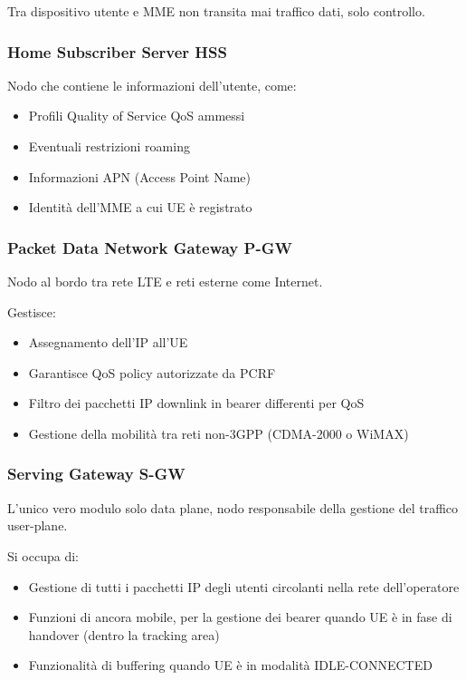 Tra dispositivo utente e MME non transita mai traffico dati, solo controllo.

\subsubsection{Home Subscriber Server HSS} 

Nodo che contiene le informazioni dell'utente, come: 
\begin{itemize}
	\item Profili Quality of Service QoS ammessi

	\item Eventuali restrizioni roaming

	\item Informazioni APN (Access Point Name)

	\item Identità dell'MME a cui UE è registrato
\end{itemize}

\subsubsection{Packet Data Network Gateway P-GW} 

Nodo al bordo tra rete LTE e reti esterne come Internet. 

Gestisce: 
\begin{itemize}
	\item Assegnamento dell'IP all'UE

	\item Garantisce QoS policy autorizzate da PCRF

	\item Filtro dei pacchetti IP downlink in bearer differenti per QoS

	\item Gestione della mobilità tra reti non-3GPP (CDMA-2000 o WiMAX)
\end{itemize}

\subsubsection{Serving Gateway S-GW} 

L'unico vero modulo solo data plane, nodo responsabile della gestione del traffico user-plane. 

Si occupa di:
\begin{itemize}
	\item Gestione di tutti i pacchetti IP degli utenti circolanti nella rete dell'operatore

	\item Funzioni di ancora mobile, per la gestione dei bearer quando UE è in fase di handover (dentro la tracking area)

	\item Funzionalità di buffering quando UE è in modalità IDLE-CONNECTED
\end{itemize}

